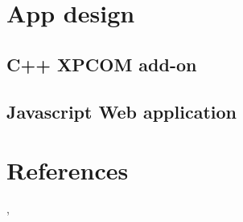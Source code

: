 \documentclass[12pt]{article}
\begin{document}
\section{App design}
\subsection{C++ XPCOM add-on}

\subsection{Javascript Web application}

\section{References} \cite{videoTR}, \cite{ChronosTR}


\end{document}
